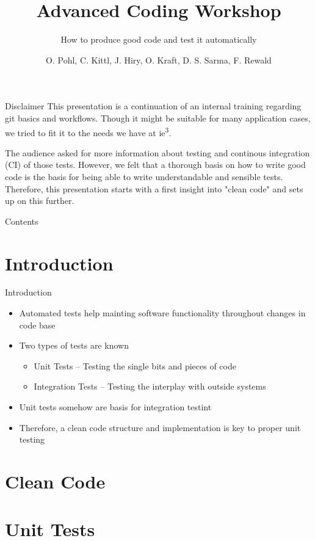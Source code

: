 \documentclass[aspectratio=1610, 9pt]{beamer}
\title{Advanced Coding Workshop}
\subtitle{How to produce good code and test it automatically}
\author[\iethree{}-Team]{O. Pohl, C. Kittl, J. Hiry, O. Kraft, D. S. Sarma, F. Rewald}
\institute[\iethree{}]{Institute of Energy Systems, Energy Efficiency and Energy Economics}
\newcommand{\iethree}{ie\textsuperscript{3}}
\begin{document}
\maketitle

\begin{frame}{Disclaimer}
    This presentation is a continuation of an internal training regarding git basics and workflows.
    Though it might be suitable for many application cases, we tried to fit it to the needs we have at \iethree{}.

    The audience asked for more information about testing and continous integration (CI) of those tests.
    However, we felt that a thorough basis on how to write good code is the basis for being able to write understandable and sensible tests.
    Therefore, this presentation starts with a first insight into "clean code" and sets up on this further.
\end{frame}

\begin{frame}{Contents}
    \tableofcontents
\end{frame}

\section{Introduction}
\begin{frame}{Introduction}
    \begin{itemize}
        \item Automated tests help mainting software functionality throughout changes in code base
        \item Two types of tests are known
        \begin{itemize}
            \item Unit Tests -- Testing the single bits and pieces of code
            \item Integration Tests -- Testing the interplay with outside systems
        \end{itemize}
        \item Unit tests somehow are basis for integration testint
        \item Therefore, a clean code structure and implementation is key to proper unit testing
    \end{itemize}
\end{frame}

\section{Clean Code}
\begin{frame}
    
\end{frame}

\section{Unit Tests}
\end{document}
